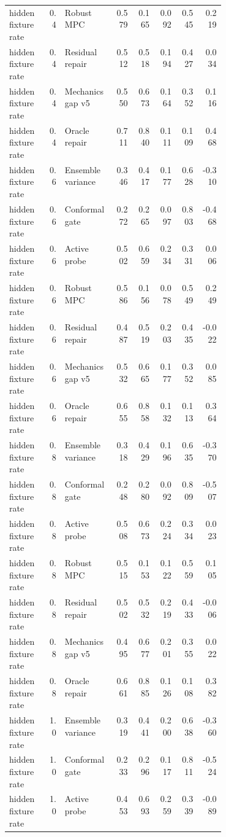 \documentclass{article}
\begin{document}
\begin{center}
\begin{longtable}{p{0.18\linewidth}rp{0.23\linewidth}rrrrr}
hidden fixture rate & 0.4 & Robust MPC & 0.579 & 0.165 & 0.092 & 0.545 & 0.219\\
hidden fixture rate & 0.4 & Residual repair & 0.512 & 0.518 & 0.194 & 0.427 & 0.034\\
hidden fixture rate & 0.4 & Mechanics gap v5 & 0.550 & 0.673 & 0.164 & 0.352 & 0.116\\
hidden fixture rate & 0.4 & Oracle repair & 0.711 & 0.840 & 0.111 & 0.109 & 0.468\\
hidden fixture rate & 0.6 & Ensemble variance & 0.346 & 0.417 & 0.177 & 0.628 & -0.310\\
hidden fixture rate & 0.6 & Conformal gate & 0.272 & 0.265 & 0.097 & 0.803 & -0.468\\
hidden fixture rate & 0.6 & Active probe & 0.502 & 0.659 & 0.234 & 0.331 & 0.006\\
hidden fixture rate & 0.6 & Robust MPC & 0.586 & 0.156 & 0.078 & 0.549 & 0.249\\
hidden fixture rate & 0.6 & Residual repair & 0.487 & 0.519 & 0.203 & 0.435 & -0.022\\
hidden fixture rate & 0.6 & Mechanics gap v5 & 0.532 & 0.665 & 0.177 & 0.352 & 0.085\\
hidden fixture rate & 0.6 & Oracle repair & 0.655 & 0.858 & 0.132 & 0.113 & 0.364\\
hidden fixture rate & 0.8 & Ensemble variance & 0.318 & 0.429 & 0.196 & 0.635 & -0.370\\
hidden fixture rate & 0.8 & Conformal gate & 0.248 & 0.280 & 0.092 & 0.809 & -0.507\\
hidden fixture rate & 0.8 & Active probe & 0.508 & 0.673 & 0.224 & 0.334 & 0.023\\
hidden fixture rate & 0.8 & Robust MPC & 0.515 & 0.153 & 0.122 & 0.559 & 0.105\\
hidden fixture rate & 0.8 & Residual repair & 0.502 & 0.532 & 0.219 & 0.433 & -0.006\\
hidden fixture rate & 0.8 & Mechanics gap v5 & 0.495 & 0.677 & 0.201 & 0.355 & 0.022\\
hidden fixture rate & 0.8 & Oracle repair & 0.661 & 0.885 & 0.126 & 0.108 & 0.382\\
hidden fixture rate & 1.0 & Ensemble variance & 0.319 & 0.441 & 0.200 & 0.638 & -0.360\\
hidden fixture rate & 1.0 & Conformal gate & 0.233 & 0.296 & 0.117 & 0.811 & -0.524\\
hidden fixture rate & 1.0 & Active probe & 0.453 & 0.693 & 0.259 & 0.339 & -0.089\\

\end{longtable}
\end{center}
\end{document}
